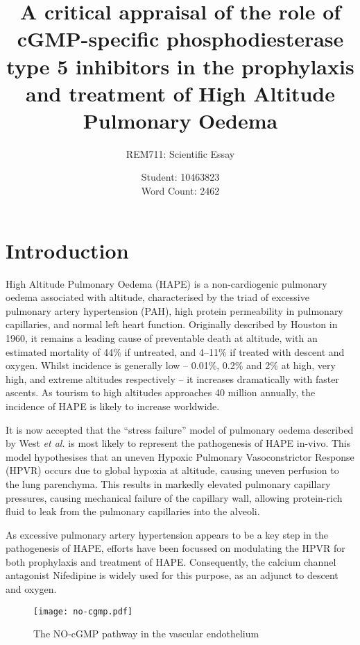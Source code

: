 \documentclass[12pt,a4paper]{article}
\title{A critical appraisal of the role of cGMP-specific phosphodiesterase type 5 inhibitors in the prophylaxis and treatment of High Altitude Pulmonary Oedema}
\author{REM711: Scientific Essay}
\date{Student: 10463823 \\ Word Count: 2462}
\begin{document}
\maketitle


\section*{Introduction}

High Altitude Pulmonary Oedema (HAPE) is a non-cardiogenic pulmonary oedema associated with altitude, characterised by the triad of excessive pulmonary artery hypertension (PAH), high protein permeability in pulmonary capillaries, and normal left heart function.\cite{Fred:1962hy,Roy:1969tt,Schoene:1988tz} Originally described by Houston in 1960, it remains a leading cause of preventable death at altitude, with an estimated mortality of 44\% if untreated, and 4--11\% if treated with descent and oxygen.\cite{HOUSTON:1960gz,Lobenhoffer:1982eg,MENON:1965gk} Whilst incidence is generally low -- 0.01\%, 0.2\% and 2\% at high, very high, and extreme altitudes respectively -- it increases dramatically with faster ascents.\cite{Bartsch:2002cg} As tourism to high altitudes approaches 40 million annually, the incidence of HAPE is likely to increase worldwide.\cite{West:ug}

It is now accepted that the ``stress failure'' model of pulmonary oedema described by West \emph{et al.} is most likely to represent the pathogenesis of HAPE in-vivo.\cite{Maggiorini:2001vq} This model hypothesises that an uneven Hypoxic Pulmonary Vasoconstrictor Response (HPVR) occurs due to global hypoxia at altitude, causing uneven perfusion to the lung parenchyma. This results in markedly elevated pulmonary capillary pressures, causing mechanical failure of the capillary wall, allowing protein-rich fluid to leak from the pulmonary capillaries into the alveoli.\cite{West:1991vc,West:1995tg}

As excessive pulmonary artery hypertension appears to be a key step in the pathogenesis of HAPE,\cite{Maggiorini:2001vq,Swenson:2002ub} efforts have been focussed on modulating the HPVR for both prophylaxis and treatment of HAPE. Consequently, the calcium channel antagonist Nifedipine is widely used for this purpose, as an adjunct to descent and oxygen.\cite{Luks:2010ht}

\begin{figure}[!hb]
\centering
\texttt{[image: no-cgmp.pdf]}
\caption{The NO-cGMP pathway in the vascular endothelium\cite{Archer:2009cx}}
\label{fig:no-cgmp_pathway}
\end{figure}
\end{document}
